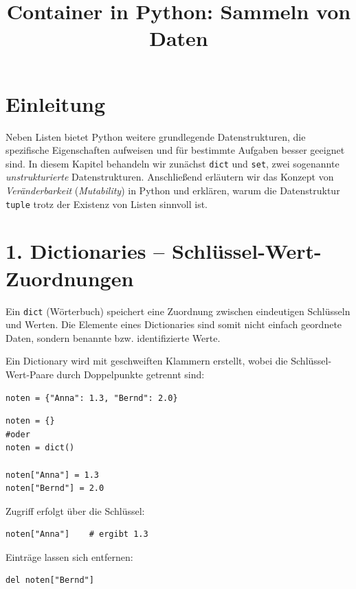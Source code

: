 \documentclass[12pt]{article}
\title{Container in Python: Sammeln von Daten}
\author{}
\date{}
\begin{document}
	
	\maketitle
	
	\section*{Einleitung}
	
	Neben Listen bietet Python weitere grundlegende Datenstrukturen, die spezifische Eigenschaften aufweisen und für bestimmte Aufgaben besser geeignet sind. In diesem Kapitel behandeln wir zunächst \texttt{dict} und \texttt{set}, zwei sogenannte \emph{unstrukturierte} Datenstrukturen. Anschließend erläutern wir das Konzept von \emph{Veränderbarkeit} (\emph{Mutability}) in Python und erklären, warum die Datenstruktur \texttt{tuple} trotz der Existenz von Listen sinnvoll ist.
	
	\section*{1. Dictionaries – Schlüssel-Wert-Zuordnungen}
	
	Ein \texttt{dict} (Wörterbuch) speichert eine Zuordnung zwischen eindeutigen Schlüsseln und Werten. Die Elemente eines Dictionaries sind somit nicht einfach geordnete Daten, sondern benannte bzw. identifizierte Werte.
	
	Ein Dictionary wird mit geschweiften Klammern erstellt, wobei die Schlüssel-Wert-Paare durch Doppelpunkte getrennt sind:
	
\begin{verbatim}
noten = {"Anna": 1.3, "Bernd": 2.0}
\end{verbatim}

\begin{verbatim}
noten = {}
#oder
noten = dict()

noten["Anna"] = 1.3
noten["Bernd"] = 2.0
\end{verbatim}
	
	Zugriff erfolgt über die Schlüssel:
	
\begin{verbatim}
noten["Anna"]    # ergibt 1.3
\end{verbatim}
	
	Einträge lassen sich entfernen:
	
\begin{verbatim}
del noten["Bernd"]
\end{verbatim}
	
\end{document}
